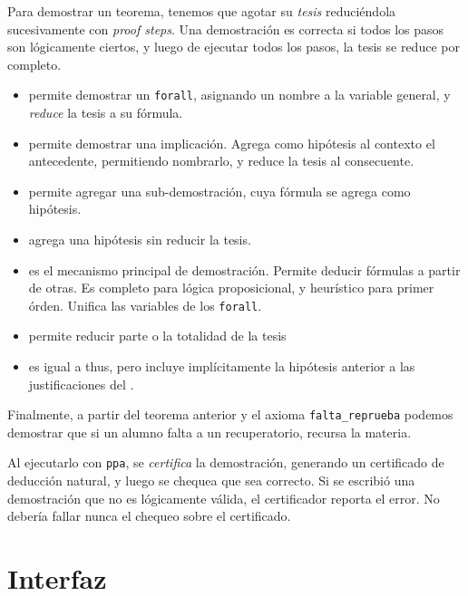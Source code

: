 Para demostrar un teorema, tenemos que agotar su \textit{tesis} reduciéndola
sucesivamente con \textit{proof steps}. Una demostración es correcta si todos
los pasos son lógicamente ciertos, y luego de ejecutar todos los pasos, la tesis
se reduce por completo.

\begin{itemize}
    \item \cmdLet{} permite demostrar un \lstinline{forall}, asignando un nombre
    a la variable general, y \textit{reduce} la tesis a su fórmula.
    \item \cmdSuppose{} permite demostrar una implicación. Agrega como
    hipótesis al contexto el antecedente, permitiendo nombrarlo, y reduce la
    tesis al consecuente.
    \item \cmdClaim{} permite agregar una sub-demostración, cuya fórmula se
    agrega como hipótesis.
    \item \cmdHave{} agrega una hipótesis sin reducir la tesis.
    \item \cmdBy{} es el mecanismo principal de demostración. Permite deducir
    fórmulas a partir de otras. Es completo para lógica proposicional, y
    heurístico para primer órden. Unifica las variables de los \lstinline{forall}.
    \item \cmdThus{} permite reducir parte o la totalidad de la tesis
    \item \cmdHence{} es igual a thus, pero incluye implícitamente la
    hipótesis anterior a las justificaciones del \cmdBy{}.
\end{itemize}

Finalmente, a partir del teorema anterior y el axioma \lstinline{falta_reprueba}
podemos demostrar que si un alumno falta a un recuperatorio, recursa la materia.

\begin{figure}[H]
    
\end{figure}

Al ejecutarlo con \texttt{ppa}, se \textit{certifica} la demostración, generando
un certificado de deducción natural, y luego se chequea que sea correcto. Si se
escribió una demostración que no es lógicamente válida, el certificador reporta
el error. No debería fallar nunca el chequeo sobre el certificado.

\section{Interfaz}

